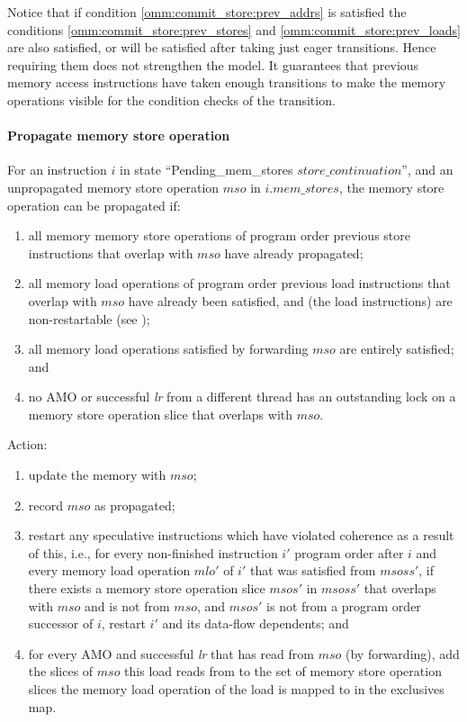 \begin{commentary}
Notice that if condition \ref{omm:commit_store:prev_addrs} is satisfied the conditions \ref{omm:commit_store:prev_stores} and \ref{omm:commit_store:prev_loads} are also satisfied, or will be satisfied after taking just eager transitions.
Hence requiring them does not strengthen the model.
It guarantees that previous memory access instructions have taken enough transitions to make the memory operations visible for the condition checks of the  transition.
\end{commentary}


\paragraph{Propagate memory store operation}\label{omm:thread:prop_mem_write}
For an instruction $i$ in state ``{\sc Pending\_mem\_stores} $store\_continuation$'', and an unpropagated memory store operation $mso$ in $i.mem\_stores$, the memory store operation can be propagated if:
\begin{enumerate}
\item all memory memory store operations of program order previous store instructions that overlap with $mso$ have already propagated;
\item all memory load operations of program order previous load instructions that overlap with $mso$ have already been satisfied, and (the load instructions) are non-restartable (see );
\item all memory load operations satisfied by forwarding $mso$ are entirely satisfied; and
\item no AMO or successful {\em lr} from a different thread has an outstanding lock on a memory store operation slice that overlaps with $mso$.
\end{enumerate}
Action:
\begin{enumerate}
\item update the memory with $mso$;
\item record $mso$ as propagated;
\item restart any speculative instructions which have violated coherence as a result of this, i.e., for every non-finished instruction $i'$ program order after $i$ and every memory load operation $mlo'$ of $i'$ that was satisfied from $msoss'$, if there exists a memory store operation slice $msos'$ in $msoss'$ that overlaps with $mso$ and is not from $mso$, and $msos'$ is not from a program order successor of $i$, restart $i'$ and its data-flow dependents; and
\item for every AMO and successful {\em lr} that has read from $mso$ (by forwarding), add the slices of $mso$ this load reads from to the set of memory store operation slices the memory load operation of the load is mapped to in the exclusives map.
\end{enumerate}

